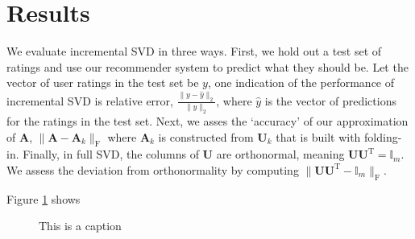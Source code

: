 \documentclass{article} %
\newcommand{\A}{\mathbf{A}}
\newcommand{\T}{\textrm{T}}
\begin{document}
\section{Results}

We evaluate incremental SVD in three ways. 
First, we hold out a test set of ratings and use our recommender system to predict what they should be.
Let the vector of user ratings in the test set be $y$, one indication of 
the performance of incremental SVD is relative error, $\frac{\|y - \hat{y}\|_2}{\|y\|_2}$, where $\hat{y}$ is the vector of predictions for the ratings in the test set.
Next, we asses the `accuracy' of our approximation of $\A$, $\|\A - \A_k\|_{\textrm{F}}$ where $\A_k$ is constructed from $\mathbf{U}_k$ that is built with folding-in.
Finally, in full SVD, the columns of $\mathbf{U}$ are orthonormal, meaning $\mathbf{U}\mathbf{U}^{\T} = \mathbb{I}_m$. 
We assess the deviation from orthonormality by computing $\|\mathbf{U}\mathbf{U}^{\T} - \mathbb{I}_m\|_{\textrm{F}}$.

Figure \ref{fig:error_small} shows 

\begin{figure}[H]
\begin{center}
\end{center}
\caption{This is a caption}
\label{fig:error_small}
\end{figure}
\end{document}
